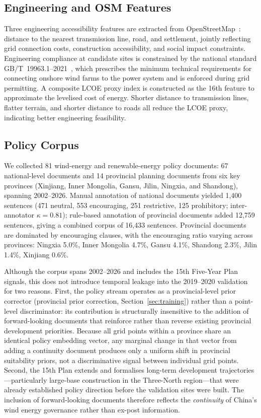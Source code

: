 \documentclass[12pt, a4paper]{article}
\begin{document}
\subsection{Engineering and OSM Features}

Three engineering accessibility features are extracted from
OpenStreetMap~\cite{osm2023}: distance to the nearest
transmission line, road, and settlement, jointly reflecting
grid connection costs, construction accessibility, and social
impact constraints. Engineering compliance at candidate sites
is constrained by the national standard
GB/T~19963.1--2021~\cite{gbt19963}, which prescribes the
minimum technical requirements for connecting onshore wind
farms to the power system and is enforced during grid
permitting. A composite LCOE proxy index is constructed
as the 16th feature to approximate the levelised cost of energy.
Shorter distance to transmission lines, flatter terrain, and
shorter distance to roads all reduce the LCOE proxy, indicating
better engineering feasibility.

\subsection{Policy Corpus}

We collected 81 wind-energy and renewable-energy policy
documents: 67 national-level documents and 14 provincial
planning documents from six key provinces (Xinjiang, Inner
Mongolia, Gansu, Jilin, Ningxia, and Shandong), spanning
2002--2026. Manual annotation of national documents yielded
1,400 sentences (471 neutral, 553 encouraging, 251
restrictive, 125 prohibitory; inter-annotator $\kappa=0.81$);
rule-based annotation of provincial documents added 12,759
sentences, giving a combined corpus of 16,433 sentences.
Provincial documents are dominated by encouraging clauses,
with the encouraging ratio varying across provinces: Ningxia
5.0\%, Inner Mongolia 4.7\%, Gansu 4.1\%, Shandong 2.3\%,
Jilin 1.4\%, Xinjiang 0.6\%.

Although the corpus spans 2002--2026 and includes the 15th
Five-Year Plan signals, this does not introduce temporal
leakage into the 2019--2020 validation for two reasons.
First, the policy stream operates as a provincial-level prior
corrector (provincial prior correction,
Section~\ref{sec:training}) rather than a
point-level discriminator: its contribution is structurally
insensitive to the addition of forward-looking documents that
reinforce rather than reverse existing provincial development
priorities. Because all grid points within a province share
an identical policy embedding vector, any marginal change in
that vector from adding a continuity document produces only a
uniform shift in provincial suitability priors, not a
discriminative signal between individual grid points. Second,
the 15th Plan extends and formalises long-term development
trajectories---particularly large-base construction in the
Three-North region---that were already established policy
direction before the validation sites were built. The
inclusion of forward-looking documents therefore reflects the
\textit{continuity} of China's wind energy governance rather
than ex-post information.
\end{document}
